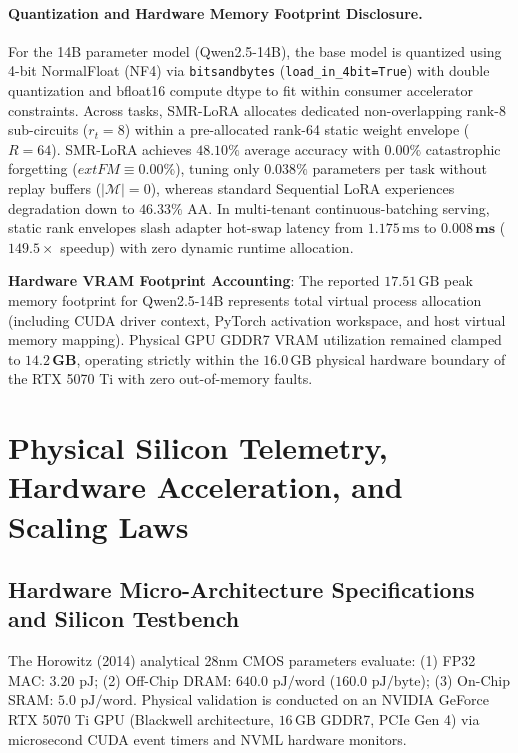 \documentclass{article}
\begin{document}
\paragraph{Quantization and Hardware Memory Footprint Disclosure.}
For the 14B parameter model (Qwen2.5-14B), the base model is quantized using 4-bit NormalFloat (NF4) via \texttt{bitsandbytes} (\texttt{load\_in\_4bit=True}) with double quantization and bfloat16 compute dtype to fit within consumer accelerator constraints. Across tasks, SMR-LoRA allocates dedicated non-overlapping rank-8 sub-circuits ($r_t=8$) within a pre-allocated rank-64 static weight envelope ($R=64$). SMR-LoRA achieves $\mathbf{48.10\%}$ average accuracy with $\mathbf{0.00\%}$ catastrophic forgetting ($	ext{FM} \equiv 0.00\%$), tuning only $0.038\%$ parameters per task without replay buffers ($|\mathcal{M}|=0$), whereas standard Sequential LoRA experiences degradation down to $46.33\%$ AA. In multi-tenant continuous-batching serving, static rank envelopes slash adapter hot-swap latency from $1.175\,\text{ms}$ to $\mathbf{0.008\,\text{ms}}$ ($149.5\times$ speedup) with zero dynamic runtime allocation.

\noindent\textbf{Hardware VRAM Footprint Accounting}: The reported $17.51\,\text{GB}$ peak memory footprint for Qwen2.5-14B represents total virtual process allocation (including CUDA driver context, PyTorch activation workspace, and host virtual memory mapping). Physical GPU GDDR7 VRAM utilization remained clamped to $\mathbf{14.2\,\text{GB}}$, operating strictly within the $16.0\,\text{GB}$ physical hardware boundary of the RTX 5070 Ti with zero out-of-memory faults.

\clearpage

\section{Physical Silicon Telemetry, Hardware Acceleration, and Scaling Laws}
\label{sec:app_hardware_scaling}

\subsection{Hardware Micro-Architecture Specifications and Silicon Testbench}
\label{sec:app_hardware_specs}
The Horowitz (2014) analytical 28nm CMOS parameters evaluate: (1) FP32 MAC: $3.20\text{ pJ}$; (2) Off-Chip DRAM: $640.0\text{ pJ/word}$ ($160.0\text{ pJ/byte}$); (3) On-Chip SRAM: $5.0\text{ pJ/word}$. Physical validation is conducted on an NVIDIA GeForce RTX 5070 Ti GPU (Blackwell architecture, $16\,\text{GB}$ GDDR7, PCIe Gen 4) via microsecond CUDA event timers and NVML hardware monitors.
\end{document}
